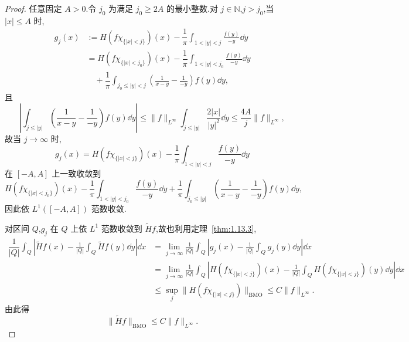 \begin{proof}
任意固定 $A > 0$.令 $j_{0}$ 为满足 $j_{0} \geq 2A$ 的最小整数.对 $j \in \mathbb{N}$,$j > j_{0}$,当 $|x| \leq A$ 时,
\begin{align*}
g_{j}(x) &:= H\left(f\chi_{\{|x| < j\}}\right)(x) - \dfrac{1}{\pi}\int_{1 < |y| < j}\frac{f(y)}{-y}\dd y \\
&= H\left(f\chi_{\{|x| < j_{0}\}}\right)(x) - \dfrac{1}{\pi}\int_{1 < |y| < j_{0}}\frac{f(y)}{-y}\dd y \\
&\quad + \dfrac{1}{\pi}\displaystyle\int_{j_{0} \leq |y| < j}\left(\frac{1}{x - y} - \frac{1}{-y}\right)f(y)\dd y,
\end{align*}
且
\begin{equation*}
\left|\int_{j \leq |y|}\left(\frac{1}{x - y} - \frac{1}{-y}\right)f(y)\dd y\right| \leq \| f \|_{L^{\infty}}\int_{j \leq |y|}\frac{2|x|}{|y|^{2}}\dd y \leq \frac{4A}{j}\| f \|_{L^{\infty}},
\end{equation*}
故当 $j \to \infty$ 时,
\begin{equation*}
g_{j}(x) = H\left(f\chi_{\{|x| < j\}}\right)(x) - \frac{1}{\pi}\int_{1 < |y| < j}\frac{f(y)}{-y}\dd y
\end{equation*}
在 $[-A, A]$ 上一致收敛到
\begin{equation*}
H\left(f\chi_{\{|x| < j_{0}\}}\right)(x) - \frac{1}{\pi}\int_{1 < |y| < j_{0}}\frac{f(y)}{-y}\dd y + \frac{1}{\pi}\int_{j_{0} \leq |y|}\left(\frac{1}{x - y} - \frac{1}{-y}\right)f(y)\dd y,
\end{equation*}
因此依 $L^{1}([-A, A])$ 范数收敛.

对区间 $Q$,$g_{j}$ 在 $Q$ 上依 $L^{1}$ 范数收敛到 $\tilde{H}f$,故也利用定理~\ref{thm:1.13.3},
\begin{align*}
\dfrac{1}{|Q|}\displaystyle\int_{Q}\left|\tilde{H}f(x) - \frac{1}{|Q|}\int_{Q}\tilde{H}f(y)\dd y\right|\dd x&= \displaystyle\lim_{j \to \infty}\frac{1}{|Q|}\int_{Q}\left|g_{j}(x) - \frac{1}{|Q|}\int_{Q}g_{j}(y)\dd y\right|\dd x  \\
&= \displaystyle\lim_{j \to \infty}\frac{1}{|Q|}\int_{Q}\left|H\left(f\chi_{\{|x| < j\}}\right)(x) - \frac{1}{|Q|}\int_{Q}H\left(f\chi_{\{|x| < j\}}\right)(y)\dd y\right|\dd x \\
&\leq \displaystyle\sup_{j}\| H\left(f\chi_{\{|x| < j\}}\right) \|_{\mathrm{BMO}} \leq C\| f \|_{L^{\infty}}.
\end{align*}
由此得
\begin{equation*}
\| \tilde{H}f \|_{\mathrm{BMO}} \leq C\| f \|_{L^{\infty}}.
\end{equation*}
\end{proof}

